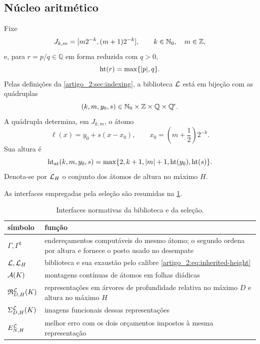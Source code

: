 \subsection{Núcleo aritmético}

Fixe
\[
 J_{k,m}=[m2^{-k},(m+1)2^{-k}],
 \qquad k\in\mathbb{N}_0,\quad m\in\mathbb Z,
\]
e, para $r=p/q\in\mathbb Q$ em forma reduzida com $q>0$,
\[
 \operatorname{ht}(r)=\max\{|p|,q\}.
\]
Pelas definições da \cref{artigo_2:sec:indexing}, a biblioteca $\mathcal{L}$ está em bijeção com as
quádruplas
\[
 (k,m,y_0,s)\in\mathbb{N}_0\times\mathbb Z\times\mathbb Q\times\mathbb{Q}^{\!*}.
\]
A quádrupla determina, em $J_{k,m}$, o átomo
\begin{equation}
 \ell(x)=y_0+s(x-x_0),
 \qquad x_0=\left(m+\frac12\right)2^{-k}.
 \label{artigo_2:eq:inherited-atom}
\end{equation}
Sua altura é
\begin{equation}
 \operatorname{ht}_{\rm at}(k,m,y_0,s)
 =\max\{2,k+1,|m|+1,\operatorname{ht}(y_0),\operatorname{ht}(s)\}.
 \label{artigo_2:eq:inherited-height}
\end{equation}
Denota-se por $\mathcal{L}_H$ o conjunto dos átomos de altura no máximo $H$.

As interfaces empregadas pela seleção são resumidas na
\cref{artigo_2:tab:interfaces}.
\begin{table}[t]
 \centering
 \caption{Interfaces normativas da biblioteca e da seleção.}
 \label{artigo_2:tab:interfaces}
 \small
 \begin{tabularx}{\linewidth}{@{}lX@{}}
  \toprule
  símbolo & função\\
  \midrule
  $\Gamma,\Gamma^\sharp$ & endereçamentos computáveis do mesmo átomo; o
  segundo ordena por altura e fornece o posto usado no desempate\\
  $\mathcal{L},\mathcal{L}_H$ & biblioteca e sua exaustão pelo calibre
  \eqref{artigo_2:eq:inherited-height}\\
  $\mathcal{A}(K)$ & montagens contínuas de átomos em folhas diádicas\\
  $\mathfrak{R}_{D,H}^{\mathcal{L}}(K)$ & representações em árvores de
  profundidade relativa no máximo $D$ e altura no máximo $H$\\
  $\Sigma_{D,H}^{\mathcal{L}}(K)$ & imagens funcionais dessas representações\\
  $E_{N,H}^{\mathcal{L}}$ & melhor erro com os dois orçamentos impostos à mesma
  representação\\
  \bottomrule
 \end{tabularx}
\end{table}

